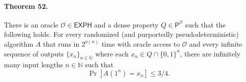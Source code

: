 \paragraph{Theorem 52.} There is an oracle $\mathcal O\in\mathsf{EXPH}$ and a dense property $Q\in\mathsf P^{\mathcal O}$ such that the following holds. For every randomized (and purportedly pseudodeterministic) algorithm $A$ that runs in $2^{o(n)}$ time with oracle access to $\mathcal O$ and every infinite sequence of outputs $\{x_n\}_{n\in\mathbb N}$ where each $x_n\in Q\cap\{0,1\}^n$, there are infinitely many input lengths $n\in\mathbb N$ such that
\[\Pr[A(1^n)=x_n]\leq3/4.\]
